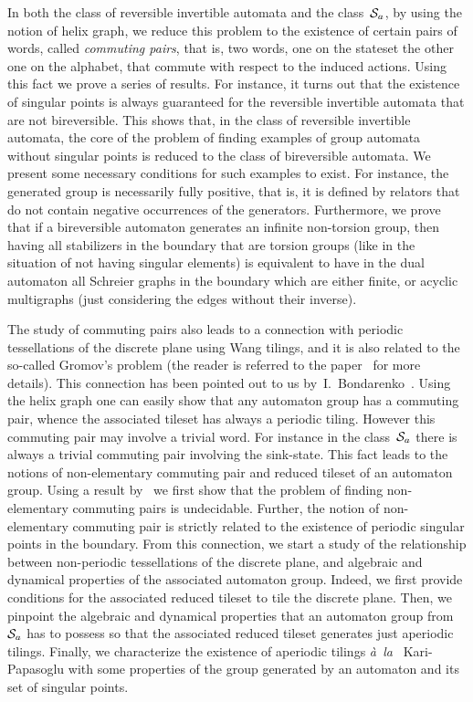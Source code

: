 \documentclass{amsart}
\begin{document}
In both the class of reversible invertible automata and the class~${\hbox{${\mathcal S}_{a}$}}$, by using the notion of helix graph, we reduce this problem to the existence of certain pairs of words, called {\it commuting pairs}, that is, two words, one on the stateset the other one on the alphabet, that commute with respect to the induced actions.
 Using this fact we prove a series of results. For instance, it turns out that the existence of singular points is always guaranteed for the reversible invertible automata that are not bireversible. This shows that, in the class of reversible invertible automata, the core of the problem of finding examples of group automata without singular points is reduced to the class of bireversible automata. We present some necessary conditions for such examples to exist. For instance, the generated group is necessarily fully positive, that is, it is defined by relators that do not contain negative occurrences of the generators. Furthermore, we prove that if a bireversible automaton generates an infinite non-torsion group, then having all stabilizers in the boundary that are torsion groups (like in the situation of not having singular elements) is equivalent to have in the dual automaton all Schreier graphs in the boundary which are either finite, or acyclic multigraphs (just considering the edges without their inverse).
\medskip

The study of commuting pairs also leads to a connection with periodic tessellations of the discrete plane using Wang tilings, and it is also related to the so-called Gromov's problem (the reader is referred to the paper~\cite{KaPa} for more details). This connection has been pointed out to us by~I.~Bondarenko~\cite{Bonda-private}. Using the helix graph one can easily show that any automaton group has a commuting pair, whence the associated tileset has always a periodic tiling. However this commuting pair may involve a trivial  word. For instance in the class~${\hbox{${\mathcal S}_{a}$}}$ there is always a trivial commuting pair involving the sink-state. This fact leads to the notions of non-elementary commuting pair and reduced tileset of an automaton group. Using a result by~\cite{LeGlo14} we first show that the problem of finding non-elementary commuting pairs is undecidable. Further, the notion of non-elementary commuting pair is strictly related to the existence of periodic singular points in the boundary. From this connection, we start a study of the relationship between non-periodic tessellations of the discrete plane, and algebraic and dynamical properties of the associated automaton group. Indeed, we first provide conditions for the associated reduced tileset to tile the discrete plane. Then, we pinpoint the algebraic and dynamical properties that an automaton group from~${\hbox{${\mathcal S}_{a}$}}$ has to possess so that the associated reduced tileset generates just aperiodic tilings. Finally, we characterize  the existence of aperiodic tilings \textit{\`a~la~} Kari-Papasoglu with some properties of the group generated by an automaton  and its set of singular points.
\end{document}
